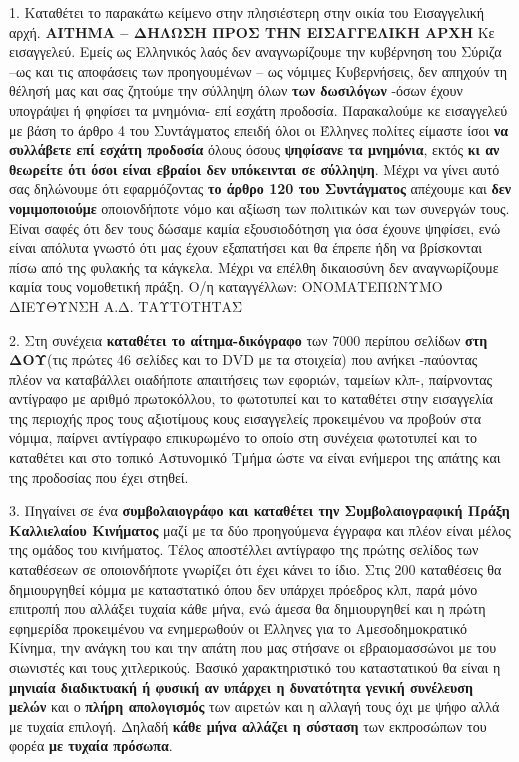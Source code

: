 \documentclass[a4paper]{article}
\begin{document}
1. Καταθέτει το παρακάτω κείμενο στην πλησιέστερη στην οικία του Εισαγγελική αρχή.
\textbf{ΑΙΤΗΜΑ – ΔΗΛΩΣΗ ΠΡΟΣ ΤΗΝ ΕΙΣΑΓΓΕΛΙΚΗ ΑΡΧΗ} Κε εισαγγελεύ. Εμείς ως Ελληνικός λαός δεν αναγνωρίζουμε την κυβέρνηση του Σύριζα --ως και τις αποφάσεις των προηγουμένων -- ως νόμιμες Κυβερνήσεις, δεν απηχούν τη θέλησή μας και σας ζητούμε την σύλληψη όλων \textbf{των δωσιλόγων} -όσων έχουν υπογράψει ή φηφίσει τα μνημόνια- επί εσχάτη προδοσία. Παρακαλούμε κε εισαγγελεύ με βάση το άρθρο 4 του Συντάγματος επειδή όλοι οι Έλληνες πολίτες είμαστε ίσοι \textbf{να συλλάβετε επί εσχάτη προδοσία} όλους όσους \textbf{ψηφίσανε τα μνημόνια}, εκτός \textbf{κι αν θεωρείτε ότι όσοι είναι εβραίοι δεν υπόκεινται σε σύλληψη}. Μέχρι να γίνει αυτό σας δηλώνουμε ότι εφαρμόζοντας \textbf{το άρθρο 120 του Συντάγματος} απέχουμε και \textbf{δεν νομιμοποιούμε} οποιονδήποτε νόμο και αξίωση των πολιτικών και των συνεργών τους. Είναι σαφές ότι δεν τους δώσαμε καμία εξουσιοδότηση για όσα έχουνε ψηφίσει, ενώ είναι απόλυτα γνωστό ότι μας έχουν εξαπατήσει και θα έπρεπε ήδη να βρίσκονται πίσω από της φυλακής τα κάγκελα.
Μέχρι να επέλθη δικαιοσύνη δεν αναγνωρίζουμε καμία τους νομοθετική πράξη. Ο/η καταγγέλλων: ΟΝΟΜΑΤΕΠΩΝΥΜΟ ΔΙΕΥΘΥΝΣΗ Α.Δ. ΤΑΥΤΟΤΗΤΑΣ

2. Στη συνέχεια \textbf{καταθέτει το αίτημα-δικόγραφο} των 7000 περίπου σελίδων \textbf{στη ΔΟΥ}(τις πρώτες 46 σελίδες και το DVD με τα στοιχεία) που ανήκει -παύοντας πλέον να καταβάλλει οιαδήποτε απαιτήσεις των εφοριών, ταμείων κλπ-, παίρνοντας αντίγραφο με αριθμό πρωτοκόλλου, το φωτοτυπεί και το καταθέτει στην εισαγγελία της περιοχής προς τους αξιοτίμους κους εισαγγελείς προκειμένου να προβούν στα νόμιμα, παίρνει αντίγραφο επικυρωμένο το οποίο στη συνέχεια φωτοτυπεί και το καταθέτει και στο τοπικό Αστυνομικό Τμήμα ώστε να είναι ενήμεροι της απάτης και της προδοσίας που έχει στηθεί.

3. Πηγαίνει σε ένα \textbf{συμβολαιογράφο και καταθέτει την Συμβολαιογραφική Πράξη Καλλιελαίου Κινήματος} μαζί με τα δύο προηγούμενα έγγραφα και πλέον είναι μέλος της ομάδος του κινήματος. Τέλος αποστέλλει αντίγραφο της πρώτης σελίδος των καταθέσεων σε οποιονδήποτε γνωρίζει ότι έχει κάνει το ίδιο. Στις 200 καταθέσεις θα δημιουργηθεί κόμμα με καταστατικό όπου δεν υπάρχει πρόεδρος κλπ, παρά μόνο επιτροπή που αλλάξει τυχαία κάθε μήνα, ενώ άμεσα θα δημιουργηθεί και η πρώτη εφημερίδα προκειμένου να ενημερωθούν οι Έλληνες για το Αμεσοδημοκρατικό Κίνημα, την ανάγκη του και την απάτη που μας στήσανε οι εβραιομασσώνοι με του σιωνιστές και τους χιτλερικούς. Βασικό χαρακτηριστικό του καταστατικού θα είναι η \textbf{μηνιαία διαδικτυακή ή φυσική αν υπάρχει η δυνατότητα γενική συνέλευση μελών} και ο \textbf{πλήρη απολογισμός} των αιρετών και η αλλαγή τους όχι με ψήφο αλλά με τυχαία επιλογή. Δηλαδή \textbf{κάθε μήνα αλλάζει η σύσταση} των εκπροσώπων του φορέα \textbf{με τυχαία πρόσωπα}.
\end{document}
